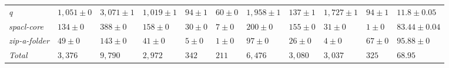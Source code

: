\begin{table}
{\begin{tabular}[t]{lllllllllll}
\textit{q} & $1,051 \pm 0$ & $3,071 \pm 1$ & $1,019 \pm 1$ & $94 \pm 1$ & $60 \pm 0$ & $1,958 \pm 1$ & $137 \pm 1$ & $1,727 \pm 1$ & $94 \pm 1$ & $11.8 \pm 0.05$\\
\textit{spacl-core} & $134 \pm 0$ & $388 \pm 0$ & $158 \pm 0$ & $30 \pm 0$ & $7 \pm 0$ & $200 \pm 0$ & $155 \pm 0$ & $31 \pm 0$ & $1 \pm 0$ & $83.44 \pm 0.04$\\
\textit{zip-a-folder} & $49 \pm 0$ & $143 \pm 0$ & $41 \pm 0$ & $5 \pm 0$ & $1 \pm 0$ & $97 \pm 0$ & $26 \pm 0$ & $4 \pm 0$ & $67 \pm 0$ & $95.88 \pm 0$\\
\hline\textit{Total} & $3,376$ & $9,790$ & $2,972$ & $342$ & $211$ & $6,476$ & $3,080$ & $3,037$ & $325$ & $68.95$\\
\bottomrule
\end{tabular}}
\end{table}
